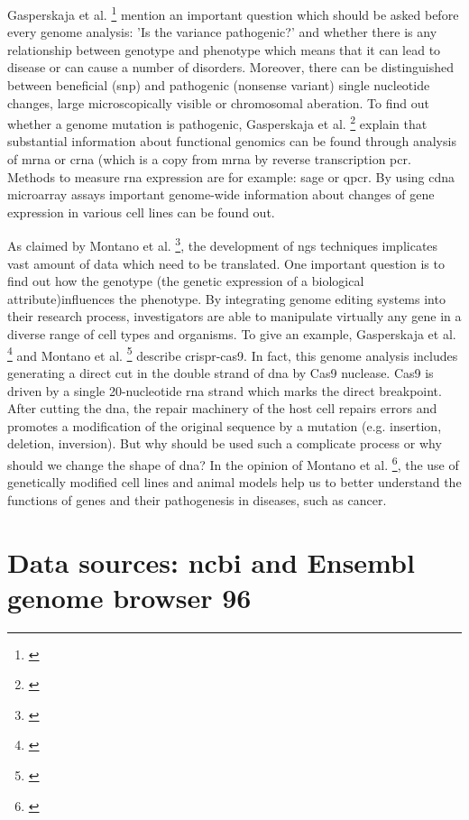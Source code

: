 {{{{Gasperskaja et al. \footnote{\autocite{gasperskaja_2017}} mention an important question which should be asked before every genome analysis: 'Is the variance pathogenic?' and whether there is any relationship between genotype and phenotype which means that it can lead to disease or can cause a number of disorders. 
Moreover, there can be distinguished between beneficial (\gls{snp}) and pathogenic (nonsense variant) single nucleotide changes, large microscopically visible or chromosomal aberation. 
To find out whether a genome mutation is pathogenic, Gasperskaja et al. \footnote{\autocite{gasperskaja_2017}} explain that substantial information about functional genomics can be found through analysis of \gls{mrna} or \gls{crna} (which is a copy from \gls{mrna} by reverse transcription \gls{pcr}.
Methods to measure \gls{rna} expression are for example: \gls{sage} or \gls{qpcr}.
By using \gls{cdna} microarray assays important genome-wide information about changes of gene expression in various cell lines can be found out.

As claimed by Montano et al. \footnote{\autocite{montano_2018}}, the development of \gls{ngs} techniques implicates vast amount of data which need to be translated. One important question is to find out how the genotype (the genetic expression of a biological attribute)influences the phenotype. By integrating genome editing systems into their research process, investigators are able to manipulate virtually any gene in a diverse range of cell types and organisms.
To give an example, Gasperskaja et al. \footnote{\autocite{gasperskaja_2017}} and Montano et al. \footnote{\autocite{montano_2018}} describe \gls{crispr-cas9}. In fact, this genome analysis includes generating a direct cut in the double strand of \gls{dna} by Cas9 nuclease. Cas9 is driven by a single 20-nucleotide \gls{rna} strand which marks the direct breakpoint. After cutting the \gls{dna}, the repair machinery of the host cell repairs errors and promotes a modification of the original sequence by a mutation (e.g. insertion, deletion, inversion).
But why should be used such a complicate process or why should we change the shape of \gls{dna}?
In the opinion of Montano et al. \footnote{\autocite{montano_2018}}, the use of genetically modified cell lines and animal models help us to better understand the functions of genes and their pathogenesis in diseases, such as cancer.
   
\section{Data sources: \gls{ncbi} and Ensembl genome browser 96}\label{datasources}

}}}}
